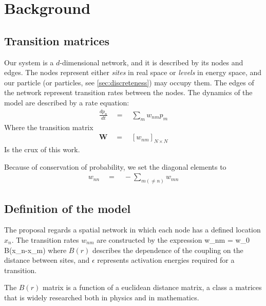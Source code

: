 \chapter{Background}

 



\section{Transition matrices}

Our system is a $d$-dimensional network, and it is
described by its nodes and edges. The nodes represent 
either {\em sites} in real space or {\em levels} in energy space, 
and our particle (or particles, see \ref{sec:discreteness}) may
occupy them. The edges of the network represent transition rates 
between the nodes. The dynamics of the model are described by 
a rate equation:
%
\begin{align}
\frac{dp_n}{dt} \quad = \quad \sum_m w_{nm}p_m
\end{align}
%
Where the transition matrix 
%
\begin{align}
\mathbf{W} \quad =  \quad \left[ w_{nm}\right]_{N\times N}
\end{align}
%
Is the crux of this work.

Because of conservation of probability, we set the diagonal
elements to
%
\begin{align}
w_{nn}\quad = \quad -\sum_{m(\ne n)} w_{mn}
\end{align}
%


\section{Definition of the model}


The proposal regards a spatial network in which each node
has a defined location $x_n$. The transition rates $w_{nm}$
are constructed by the expression
%
\beq
w_{nm} \quad = \quad w_0 B(x_n-x_m)
\eeq
%
where $B(r)$ describes the dependence of the coupling on the
distance between sites, and $\epsilon$ represents activation
energies required for a transition.


The $B(r)$ matrix is a function of a euclidean distance matrix,
a class a matrices that is widely researched 
\cite{skipetrov_eigenvalue_2011, goetschy_non-hermitian_2011,mezard_spectra_1999, bogomolny_spectral_2003}
both in physics and in mathematics.


